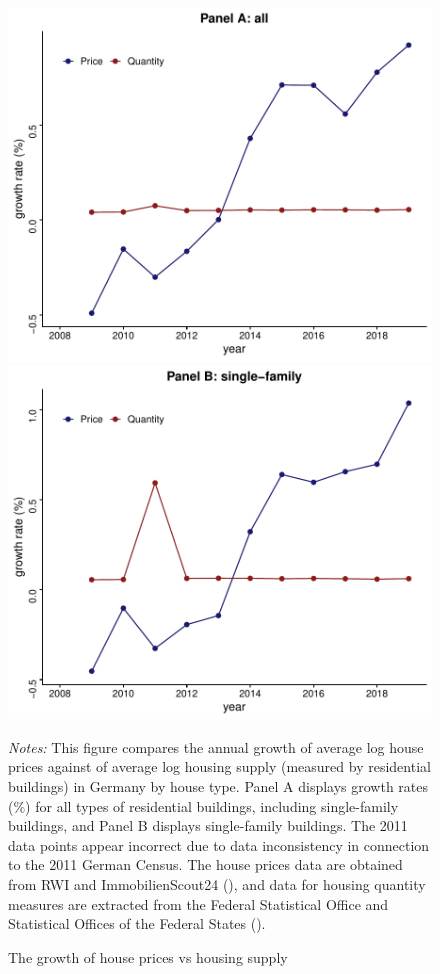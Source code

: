 \documentclass[
  12pt,
]{article}
\begin{document}
\begin{figure}[H]
\centering

\begin{center}\includegraphics[width=0.49\linewidth]{output/figs/price-quantity-growth-1} \includegraphics[width=0.49\linewidth]{output/figs/price-quantity-growth-2} \end{center}

\caption{The growth of house prices vs housing supply}\label{fig:price-quantity-growth}
\medskip
\begin{minipage}{0.9\textwidth}
\footnotesize
\textit{Notes:} This figure compares the annual growth of average log house prices against of average log housing supply (measured by residential buildings) in Germany by house type. Panel A displays growth rates (\%) for all types of residential buildings, including single-family buildings, and Panel B displays single-family buildings. The 2011 data points appear incorrect due to data inconsistency in connection to the 2011 German Census. The house prices data are obtained from RWI and ImmobilienScout24 (), and data for housing quantity measures are extracted from the Federal Statistical Office and Statistical Offices of the Federal States ().
\end{minipage}
\end{figure}
\end{document}
